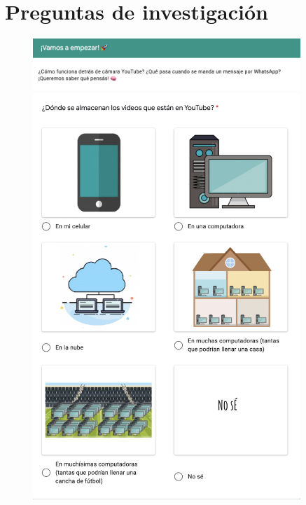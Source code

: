 \section{Preguntas de investigación}
\begin{figure}[H]
    \centering
    \includegraphics[width=0.9\textwidth]{imagenes_anexo/j.png}
    \includegraphics[width=0.9\textwidth]{imagenes_anexo/k.png}
\end{figure}

